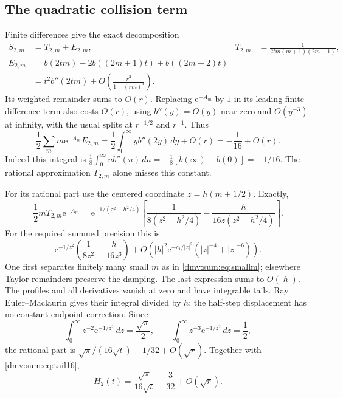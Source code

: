 \documentclass[11pt,letterpaper]{article}
\numberwithin{equation}{section}
\theoremstyle{definition}\newtheorem{definition}[theorem]{Definition}
\theoremstyle{remark}\newtheorem{remark}[theorem]{Remark}
\newcommand{\ee}{\mathrm e}
\begin{document}
\subsection{The quadratic collision term}
Finite differences give the exact decomposition
\begin{align}\label{dmv:sum:eq:S2}
 S_{2,m}&=T_{2,m}+E_{2,m},&
 T_{2,m}&=\frac1{2tm(m+1)(2m+1)},\nonumber\\
 E_{2,m}&=b(2tm)-2b((2m+1)t)+b((2m+2)t)\\
 &=t^2b''(2tm)+O\!\left(\frac{r^3}{1+(rm)^4}\right).\nonumber
\end{align}
Its weighted remainder sums to $O(r)$. Replacing $\ee^{-A_m}$ by $1$ in its leading finite-difference term also costs $O(r)$, using $b''(y)=O(y)$ near zero and $O(y^{-3})$ at infinity, with the usual splits at $r^{-1/2}$ and $r^{-1}$. Thus
\begin{equation}\label{dmv:sum:eq:tail16}
 \frac12\sum_m m\ee^{-A_m}E_{2,m}
 =\frac12\int_0^\infty yb''(2y)\,dy+O(r)=-\frac1{16}+O(r).
\end{equation}
Indeed this integral is $\frac18\int_0^\infty ub''(u)\,du=-\frac18[b(\infty)-b(0)]=-1/16$. The rational approximation $T_{2,m}$ alone misses this constant.

For its rational part use the centered coordinate $z=h(m+1/2)$. Exactly,
\begin{equation}\label{dmv:sum:eq:center}
 \frac12mT_{2,m}\ee^{-A_m}
 =\ee^{-1/(z^2-h^2/4)}\left[\frac1{8(z^2-h^2/4)}-
                       \frac h{16z(z^2-h^2/4)}\right].
\end{equation}
For the required summed precision this is
\[
 \ee^{-1/z^2}\left(\frac1{8z^2}-\frac h{16z^3}\right)
 +O\!\left(|h|^2\ee^{-c_1/|z|^2}(|z|^{-4}+|z|^{-6})\right).
\]
One first separates finitely many small $m$ as in \eqref{dmv:sum:eq:smallm}; elsewhere Taylor remainders preserve the damping. The last expression sums to $O(|h|)$. The profiles and all derivatives vanish at zero and have integrable tails. Ray Euler--Maclaurin gives their integral divided by $h$; the half-step displacement has no constant endpoint correction. Since
\[
 \int_0^\infty z^{-2}\ee^{-1/z^2}\,dz=\frac{\sqrt\pi}2,
 \qquad \int_0^\infty z^{-3}\ee^{-1/z^2}\,dz=\frac12,
\]
the rational part is $\sqrt\pi/(16\sqrt t)-1/32+O(\sqrt r)$. Together with \eqref{dmv:sum:eq:tail16},
\begin{equation}\label{dmv:sum:eq:H2}
 H_2(t)=\frac{\sqrt\pi}{16\sqrt t}-\frac3{32}+O(\sqrt r).
\end{equation}
\end{document}
